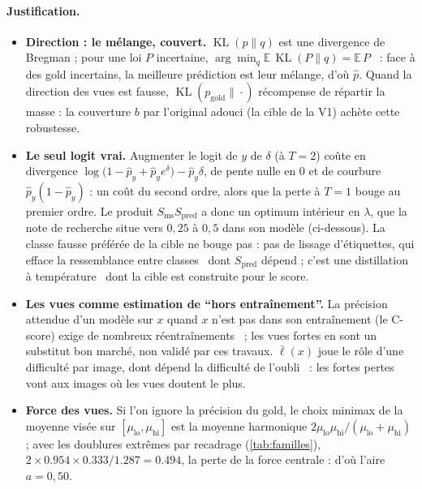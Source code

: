 \documentclass[11pt,a4paper]{article}
\newcommand{\KL}{\operatorname{KL}}
\newcommand{\gold}{\mathrm{gold}}
\begin{document}
\paragraph{Justification.}
\begin{itemize}[leftmargin=1.2em]
  \item \textbf{Direction : le mélange, couvert.} $\KL(p\|q)$ est une divergence de Bregman ; pour
    une loi $P$ incertaine, $\arg\min_q\mathbb{E}\,\KL(P\|q)=\mathbb{E}\,P$~\cite{banerjee2005bregman} :
    face à des gold incertains, la meilleure prédiction est leur mélange, d'où $\hat p$. Quand la
    direction des vues est fausse, $\KL(p_\gold\|\cdot)$ récompense de répartir la masse : la
    couverture $b$ par l'original adouci (la cible de la V1) achète cette robustesse.
  \item \textbf{Le seul logit vrai.} Augmenter le logit de $y$ de $\delta$ (à $T=2$) coûte en
    divergence $\log\bigl(1-\hat p_y+\hat p_ye^\delta\bigr)-\hat p_y\delta$, de pente nulle en 0 et de
    courbure $\hat p_y(1-\hat p_y)$ : un coût du second ordre, alors que la perte à $T=1$ bouge au
    premier ordre. Le produit $S_{\text{ms}}S_{\text{pred}}$ a donc un optimum intérieur en
    $\lambda$, que la note de recherche situe vers $0{,}25$ à $0{,}5$ dans son modèle (ci-dessous).
    La classe fausse préférée de la cible ne bouge pas : pas de lissage d'étiquettes, qui efface la
    ressemblance entre classes~\cite{muller2019} dont $S_{\text{pred}}$ dépend ; c'est une
    distillation à température~\cite{hinton2015} dont la cible est construite pour le score.
  \item \textbf{Les vues comme estimation de \enquote{hors entraînement}.} La précision attendue
    d'un modèle sur $x$ quand $x$ n'est pas dans son entraînement (le C-score) exige de nombreux
    réentraînements~\cite{jiang2021cscore} ; les vues fortes en sont un substitut bon marché, non
    validé par ces travaux. $\bar\ell(x)$ joue le rôle d'une difficulté par image, dont dépend la
    difficulté de l'oubli~\cite{zhao2024hard} : les fortes pertes vont aux images où les vues
    doutent le plus.
  \item \textbf{Force des vues.} Si l'on ignore la précision du gold, le choix minimax de la
    moyenne visée sur $[\mu_{\text{lo}},\mu_{\text{hi}}]$ est la moyenne harmonique
    $2\mu_{\text{lo}}\mu_{\text{hi}}/(\mu_{\text{lo}}+\mu_{\text{hi}})$ ; avec les doublures
    extrêmes par recadrage (\cref{tab:familles}),
    $2\times\num{0.954}\times\num{0.333}/\num{1.287}=\num{0.494}$, la perte de la force centrale :
    d'où l'aire $a=0{,}50$.
\end{itemize}
\end{document}
